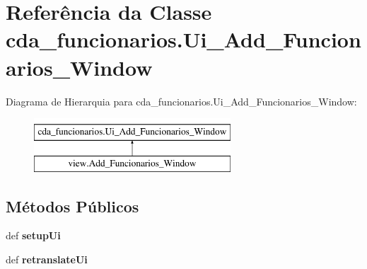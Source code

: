 \hypertarget{classcda__funcionarios_1_1Ui__Add__Funcionarios__Window}{\section{\-Referência da \-Classe cda\-\_\-funcionarios.\-Ui\-\_\-\-Add\-\_\-\-Funcionarios\-\_\-\-Window}
\label{classcda__funcionarios_1_1Ui__Add__Funcionarios__Window}
}
\-Diagrama de \-Hierarquia para cda\-\_\-funcionarios.\-Ui\-\_\-\-Add\-\_\-\-Funcionarios\-\_\-\-Window\-:\begin{figure}[H]
\begin{center}
\leavevmode
\includegraphics[height=2.000000cm]{classcda__funcionarios_1_1Ui__Add__Funcionarios__Window}
\end{center}
\end{figure}
\subsection*{\-Métodos \-Públicos}
\begin{DoxyCompactItemize}
\item 
\hypertarget{classcda__funcionarios_1_1Ui__Add__Funcionarios__Window_a91e2f973677f4562d8ce10ef99a9a6ed}{def {\bfseries setup\-Ui}}\label{classcda__funcionarios_1_1Ui__Add__Funcionarios__Window_a91e2f973677f4562d8ce10ef99a9a6ed}

\item 
\hypertarget{classcda__funcionarios_1_1Ui__Add__Funcionarios__Window_a3b857851bf35326756c4381bf8c0a14d}{def {\bfseries retranslate\-Ui}}\label{classcda__funcionarios_1_1Ui__Add__Funcionarios__Window_a3b857851bf35326756c4381bf8c0a14d}

\end{DoxyCompactItemize}
